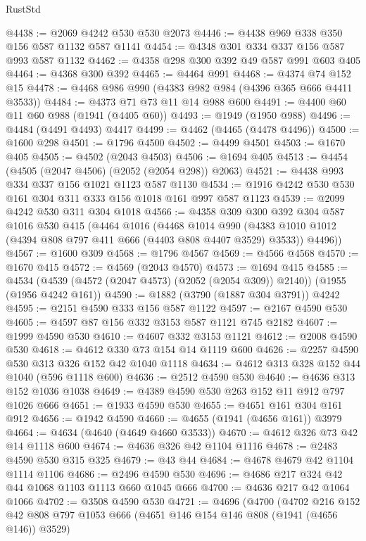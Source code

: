 \begin{lexlean}{RustStd}
\begin{coremodule}
@4438 := @2069 @4242 @530 @530 @2073
@4446 := @4438 @969 @338 @350 @156 @587 @1132 @587 @1141
@4454 := @4348 @301 @334 @337 @156 @587 @993 @587 @1132
@4462 := @4358 @298 @300 @392 @49 @587 @991 @603 @405
@4464 := @4368 @300 @392
@4465 := @4464 @991
@4468 := @4374 @74 @152 @15
@4478 := @4468 @986 @990 (@4383 @982 @984 (@4396 @365 @666 @4411 @3533))
@4484 := @4373 @71 @73 @11 @14 @988 @600
@4491 := @4400 @60 @11 @60 @988 (@1941 (@4405 @60))
@4493 := @1949 (@1950 @988)
@4496 := @4484 (@4491 @4493) @4417
@4499 := @4462 (@4465 (@4478 @4496))
@4500 := @1600 @298
@4501 := @1796 @4500
@4502 := @4499 @4501
@4503 := @1670 @405
@4505 := @4502 (@2043 @4503)
@4506 := @1694 @405
@4513 := @4454 (@4505 (@2047 @4506) (@2052 (@2054 @298)) @2063)
@4521 := @4438 @993 @334 @337 @156 @1021 @1123 @587 @1130
@4534 := @1916 @4242 @530 @530 @161 @304 @311 @333 @156 @1018 @161 @997 @587 @1123
@4539 := @2099 @4242 @530 @311 @304 @1018
@4566 := @4358
    @309
    @300
    @392
    @304
    @587
    @1016
    @530
    @415
    (@4464
      @1016
      (@4468
        @1014
        @990
        (@4383 @1010 @1012 (@4394 @808 @797 @411 @666 (@4403 @808 @4407 @3529) @3533))
        @4496))
@4567 := @1600 @309
@4568 := @1796 @4567
@4569 := @4566 @4568
@4570 := @1670 @415
@4572 := @4569 (@2043 @4570)
@4573 := @1694 @415
@4585 := @4534 (@4539 (@4572 (@2047 @4573) (@2052 (@2054 @309)) @2140)) (@1955 (@1956 @4242 @161))
@4590 := @1882 (@3790 (@1887 @304 @3791)) @4242
@4595 := @2151 @4590 @333 @156 @587 @1122
@4597 := @2167 @4590 @530
@4605 := @4597 @87 @156 @332 @3153 @587 @1121 @745 @2182
@4607 := @1999 @4590 @530
@4610 := @4607 @332 @3153 @1121
@4612 := @2008 @4590 @530
@4618 := @4612 @330 @73 @154 @14 @1119 @600
@4626 := @2257 @4590 @530 @313 @326 @152 @42 @1040 @1118
@4634 := @4612 @313 @328 @152 @44 @1040 (@596 @1118 @600)
@4636 := @2512 @4590 @530
@4640 := @4636 @313 @152 @1036 @1038
@4649 := @4389 @4590 @530 @263 @152 @11 @912 @797 @1026 @666
@4651 := @1933 @4590 @530
@4655 := @4651 @161 @304 @161 @912
@4656 := @1942 @4590
@4660 := @4655 (@1941 (@4656 @161)) @3979
@4664 := @4634 (@4640 (@4649 @4660 @3533))
@4670 := @4612 @326 @73 @42 @14 @1118 @600
@4674 := @4636 @326 @42 @1104 @1116
@4678 := @2483 @4590 @530 @315 @325
@4679 := @43 @44
@4684 := @4678 @4679 @42 @1104 @1114 @1106
@4686 := @2496 @4590 @530
@4696 := @4686 @217 @324 @42 @44 @1068 @1103 @1113 @660 @1045 @666
@4700 := @4636 @217 @42 @1064 @1066
@4702 := @3508 @4590 @530
@4721 := @4696
    (@4700
      (@4702
        @216
        @152
        @42
        @808
        @797
        @1053
        @666
        (@4651 @146 @154 @146 @808 (@1941 (@4656 @146)) @3529)

\end{coremodule}
\end{lexlean}
